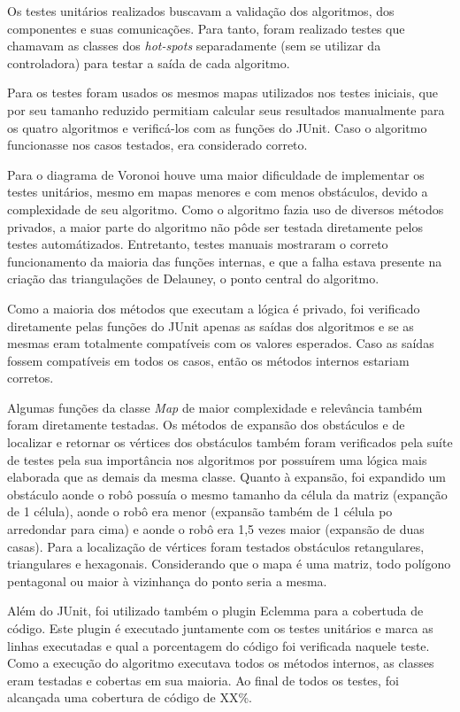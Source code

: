 Os testes unitários realizados buscavam a validação dos algoritmos, dos componentes e suas comunicações. Para tanto, foram realizado testes que chamavam as classes dos \textit{hot-spots} separadamente (sem se utilizar da controladora) para testar a saída de cada algoritmo.

Para os testes foram usados os mesmos mapas utilizados nos testes iniciais, que por seu tamanho reduzido permitiam calcular seus resultados manualmente para os quatro algoritmos e verificá-los com as funções do JUnit. Caso o algoritmo funcionasse nos casos testados, era considerado correto.

Para o diagrama de Voronoi houve uma maior dificuldade de implementar os testes unitários, mesmo em mapas menores e com menos obstáculos, devido a complexidade de seu algoritmo. Como o algoritmo fazia uso de diversos métodos privados, a maior parte do algoritmo não pôde ser testada diretamente pelos testes automátizados. Entretanto, testes manuais mostraram o correto funcionamento da maioria das funções internas, e que a falha estava presente na criação das triangulações de Delauney, o ponto central do algoritmo.

Como a maioria dos métodos que executam a lógica é privado, foi verificado diretamente pelas funções do JUnit apenas as saídas dos algoritmos e se as mesmas eram totalmente compatíveis com os valores esperados. Caso as saídas fossem compatíveis em todos os casos, então os métodos internos estariam corretos.

Algumas funções da classe \textit{Map} de maior complexidade e relevância também foram diretamente testadas. Os métodos de expansão dos obstáculos e de localizar e retornar os vértices dos obstáculos também foram verificados pela suíte de testes pela sua importância nos algoritmos por possuírem uma lógica mais elaborada que as demais da mesma classe. Quanto à expansão, foi expandido um obstáculo aonde o robô possuía o mesmo tamanho da célula da matriz (expanção de 1 célula), aonde o robô era menor (expansão também de 1 célula po arredondar para cima) e aonde o robô era 1,5 vezes maior (expansão de duas casas). Para a localização de vértices foram testados obstáculos retangulares, triangulares e hexagonais. Considerando que o mapa é uma matriz, todo polígono pentagonal ou maior à vizinhança do ponto seria a mesma.

Além do JUnit, foi utilizado também o plugin Eclemma para a cobertuda de código. Este plugin é executado juntamente com os testes unitários e marca as linhas executadas e qual a porcentagem do código foi verificada naquele teste. Como a execução do algoritmo executava todos os métodos internos, as classes eram testadas e cobertas em sua maioria. Ao final de todos os testes, foi alcançada uma cobertura de código de XX\%.

